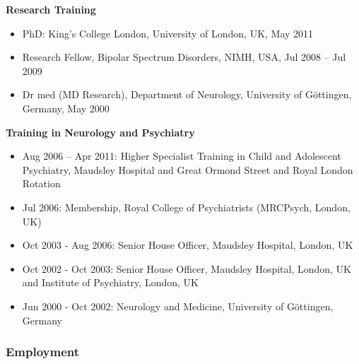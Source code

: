 \documentclass[
]{article}
\providecommand{\tightlist}{%
  \setlength{\itemsep}{0pt}\setlength{\parskip}{0pt}}
\begin{document}
\textbf{Research Training}

\begin{itemize}
\item
  PhD: King's College London, University of London, UK, May 2011\\
\item
  Research Fellow, Bipolar Spectrum Disorders, NIMH, USA, Jul 2008 --
  Jul 2009
\item
  Dr med (MD Research), Department of Neurology, University of
  Göttingen, Germany, May 2000
\end{itemize}

\textbf{Training in Neurology and Psychiatry}

\begin{itemize}
\tightlist
\item
  Aug 2006 -- Apr 2011: Higher Specialist Training in Child and
  Adolescent Psychiatry, Maudsley Hospital and Great Ormond Street and
  Royal London Rotation\\
\item
  Jul 2006: Membership, Royal College of Psychiatrists (MRCPsych,
  London, UK)\\
\item
  Oct 2003 - Aug 2006: Senior House Officer, Maudsley Hospital, London,
  UK\\
\item
  Oct 2002 - Oct 2003: Senior House Officer, Maudsley Hospital, London,
  UK and Institute of Psychiatry, London, UK\\
\item
  Jun 2000 - Oct 2002: Neurology and Medicine, University of Göttingen,
  Germany
\end{itemize}

\hypertarget{employment}{%
\subsubsection{Employment}\label{employment}}
\end{document}
